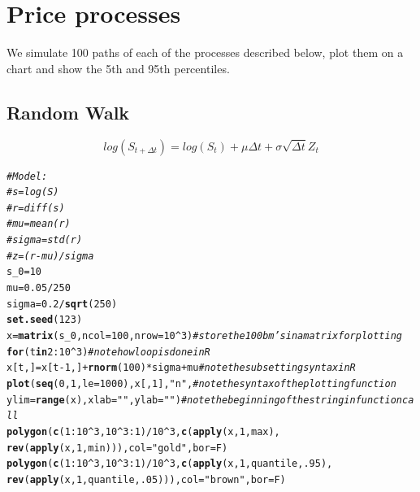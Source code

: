\documentclass[10pt]{article}\usepackage[]{graphicx}\usepackage[]{color}
\makeatletter
\newcommand{\hlnum}[1]{\textcolor[rgb]{0.686,0.059,0.569}{#1}}%
\newcommand{\hlstr}[1]{\textcolor[rgb]{0.192,0.494,0.8}{#1}}%
\newcommand{\hlcom}[1]{\textcolor[rgb]{0.678,0.584,0.686}{\textit{#1}}}%
\newcommand{\hlopt}[1]{\textcolor[rgb]{0,0,0}{#1}}%
\newcommand{\hlstd}[1]{\textcolor[rgb]{0.345,0.345,0.345}{#1}}%
\newcommand{\hlkwa}[1]{\textcolor[rgb]{0.161,0.373,0.58}{\textbf{#1}}}%
\newcommand{\hlkwb}[1]{\textcolor[rgb]{0.69,0.353,0.396}{#1}}%
\newcommand{\hlkwc}[1]{\textcolor[rgb]{0.333,0.667,0.333}{#1}}%
\newcommand{\hlkwd}[1]{\textcolor[rgb]{0.737,0.353,0.396}{\textbf{#1}}}%
\newenvironment{kframe}{%
 \def\at@end@of@kframe{}%
 \ifinner\ifhmode%
  \def\at@end@of@kframe{\end{minipage}}%
  \begin{minipage}{\columnwidth}%
 \fi\fi%
 \def\FrameCommand##1{\hskip\@totalleftmargin \hskip-\fboxsep
 \colorbox{shadecolor}{##1}\hskip-\fboxsep
     \hskip-\linewidth \hskip-\@totalleftmargin \hskip\columnwidth}%
 \MakeFramed {\advance\hsize-\width
   \@totalleftmargin\z@ \linewidth\hsize
   \@setminipage}}%
 {\par\unskip\endMakeFramed%
 \at@end@of@kframe}
\newenvironment{knitrout}{}{} %
\makeatother
\begin{document}
\section{Price processes}  

We simulate 100 paths of each of the processes described below, plot them on a chart and show the 5th and 95th percentiles.

\subsection{Random Walk}
$$log(S_{t+\Delta t})=log(S_t)+\mu \Delta t+\sigma \sqrt{\Delta t}Z_t$$
\begin{knitrout}
\color{fgcolor}\begin{kframe}
\begin{alltt}
\hlcom{# Model:}
\hlcom{# s     =log(S)}
\hlcom{# r     =diff(s)}
\hlcom{# mu    =mean(r)}
\hlcom{# sigma =std(r)}
\hlcom{# z     =(r-mu)/sigma}
\hlstd{s_0}\hlkwb{=}\hlnum{10}
\hlstd{mu}\hlkwb{=}\hlnum{0.05}\hlopt{/}\hlnum{250}
\hlstd{sigma}\hlkwb{=}\hlnum{0.2}\hlopt{/}\hlkwd{sqrt}\hlstd{(}\hlnum{250}\hlstd{)}
\hlkwd{set.seed}\hlstd{(}\hlnum{123}\hlstd{)}
\hlstd{x}\hlkwb{=}\hlkwd{matrix}\hlstd{(s_0,}\hlkwc{ncol}\hlstd{=}\hlnum{100}\hlstd{,}\hlkwc{nrow}\hlstd{=}\hlnum{10}\hlopt{^}\hlnum{3}\hlstd{)}    \hlcom{#store the 100 bm's in a matrix for plotting}
\hlkwa{for} \hlstd{(t} \hlkwa{in} \hlnum{2}\hlopt{:} \hlnum{10}\hlopt{^}\hlnum{3}\hlstd{)}                  \hlcom{#note how loop is done in R}
  \hlstd{x[t,]}\hlkwb{=}\hlstd{x[t}\hlopt{-}\hlnum{1}\hlstd{,]}\hlopt{+}\hlkwd{rnorm}\hlstd{(}\hlnum{100}\hlstd{)}\hlopt{*}\hlstd{sigma}\hlopt{+}\hlstd{mu} \hlcom{#note the subsetting syntax in R}
\hlkwd{plot}\hlstd{(}\hlkwd{seq}\hlstd{(}\hlnum{0}\hlstd{,}\hlnum{1}\hlstd{,}\hlkwc{le}\hlstd{=}\hlnum{1000}\hlstd{),x[,}\hlnum{1}\hlstd{],}\hlstr{"n"}\hlstd{,}    \hlcom{#note the syntax of the plotting function}
     \hlkwc{ylim}\hlstd{=}\hlkwd{range}\hlstd{(x),}\hlkwc{xlab}\hlstd{=}\hlstr{""}\hlstd{,}\hlkwc{ylab}\hlstd{=}\hlstr{""}\hlstd{)}    \hlcom{#note the beginning of the string in function call}
\hlkwd{polygon}\hlstd{(}\hlkwd{c}\hlstd{(}\hlnum{1}\hlopt{:}\hlnum{10}\hlopt{^}\hlnum{3}\hlstd{,}\hlnum{10}\hlopt{^}\hlnum{3}\hlopt{:}\hlnum{1}\hlstd{)}\hlopt{/}\hlnum{10}\hlopt{^}\hlnum{3}\hlstd{,}\hlkwd{c}\hlstd{(}\hlkwd{apply}\hlstd{(x,}\hlnum{1}\hlstd{,max),}
                                \hlkwd{rev}\hlstd{(}\hlkwd{apply}\hlstd{(x,}\hlnum{1}\hlstd{,min))),}\hlkwc{col}\hlstd{=}\hlstr{"gold"}\hlstd{,}\hlkwc{bor}\hlstd{=F)}
\hlkwd{polygon}\hlstd{(}\hlkwd{c}\hlstd{(}\hlnum{1}\hlopt{:}\hlnum{10}\hlopt{^}\hlnum{3}\hlstd{,}\hlnum{10}\hlopt{^}\hlnum{3}\hlopt{:}\hlnum{1}\hlstd{)}\hlopt{/}\hlnum{10}\hlopt{^}\hlnum{3}\hlstd{,}\hlkwd{c}\hlstd{(}\hlkwd{apply}\hlstd{(x,}\hlnum{1}\hlstd{,quantile,}\hlnum{.95}\hlstd{),}
                                \hlkwd{rev}\hlstd{(}\hlkwd{apply}\hlstd{(x,}\hlnum{1}\hlstd{,quantile,}\hlnum{.05}\hlstd{))),}\hlkwc{col}\hlstd{=}\hlstr{"brown"}\hlstd{,}\hlkwc{bor}\hlstd{=F)}
\end{alltt}
\end{kframe}


\end{knitrout}
\end{document}
